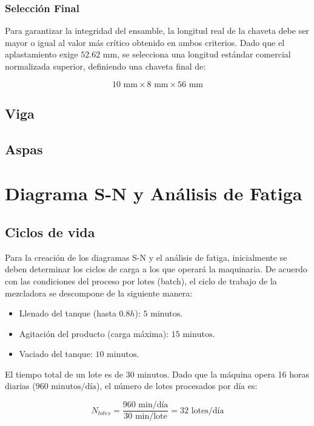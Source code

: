 \documentclass[12pt, a4paper]{article}
\begin{document}
\subsubsection*{Selección Final}
Para garantizar la integridad del ensamble, la longitud real de la chaveta debe ser mayor o igual al valor más crítico obtenido en ambos criterios. Dado que el aplastamiento exige $52.62 \text{ mm}$, se selecciona una longitud estándar comercial normalizada superior, definiendo una chaveta final de:

\begin{equation}
    10 \text{ mm} \times 8 \text{ mm} \times 56 \text{ mm}
\end{equation}

\subsection{Viga}
\subsection{Aspas}


\section{Diagrama S-N y Análisis de Fatiga}
\subsection{Ciclos de vida}

Para la creación de los diagramas S-N y el análisis de fatiga, inicialmente se deben determinar los ciclos de carga a los que operará la maquinaria. De acuerdo con las condiciones del proceso por lotes (batch), el ciclo de trabajo de la mezcladora se descompone de la siguiente manera:
\begin{itemize}
    \item Llenado del tanque (hasta $0.8h$): $5 \text{ minutos}$.
    \item Agitación del producto (carga máxima): $15 \text{ minutos}$.
    \item Vaciado del tanque: $10 \text{ minutos}$.
\end{itemize}

El tiempo total de un lote es de $30 \text{ minutos}$. Dado que la máquina opera 16 horas diarias ($960 \text{ minutos/día}$), el número de lotes procesados por día es:

\begin{equation}
    N_{lotes} = \frac{960 \text{ min/día}}{30 \text{ min/lote}} = 32 \text{ lotes/día}
\end{equation}
\end{document}
